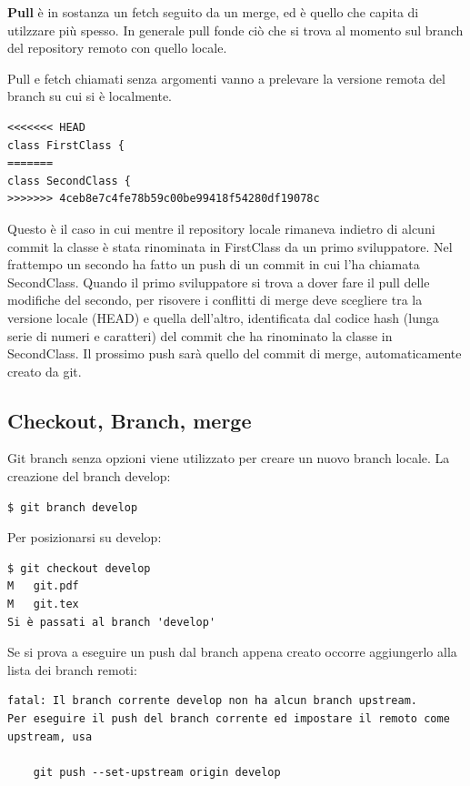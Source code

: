 \documentclass{article} \usepackage[textwidth=18cm,textheight=18cm]{geometry}
\begin{document}
\textbf{Pull} è in sostanza un fetch seguito da un merge, ed è quello che capita di
utilzzare più spesso. In generale pull fonde ciò che si trova al momento sul
branch del repository remoto con quello locale.

Pull e fetch chiamati senza argomenti vanno a prelevare la versione remota del
branch su cui si è localmente.

\begin{verbatim}
<<<<<<< HEAD
class FirstClass {
=======
class SecondClass {
>>>>>>> 4ceb8e7c4fe78b59c00be99418f54280df19078c
\end{verbatim}

Questo è il caso in cui mentre il repository locale rimaneva indietro di alcuni
commit la classe è stata rinominata in FirstClass da un primo sviluppatore. Nel
frattempo un secondo ha fatto un push di un commit in cui l'ha chiamata
SecondClass. Quando il primo sviluppatore si trova a dover fare il pull delle modifiche del
secondo, per risovere i conflitti di merge deve scegliere tra la versione locale
(HEAD) e quella dell'altro, identificata dal codice hash (lunga serie di numeri e
caratteri) del commit che ha
rinominato la classe in SecondClass. Il prossimo push sarà quello del commit di
merge, automaticamente creato da git.

\subsection{Checkout, Branch, merge}

Git branch senza opzioni viene utilizzato per creare un nuovo branch locale. La
creazione del branch develop:

\begin{verbatim}
$ git branch develop
\end{verbatim}

Per posizionarsi su develop:

\begin{verbatim}
$ git checkout develop
M	git.pdf
M	git.tex
Si è passati al branch 'develop'
\end{verbatim}

Se si prova a eseguire un push dal branch appena creato occorre
aggiungerlo alla lista dei branch remoti:

\begin{verbatim}
fatal: Il branch corrente develop non ha alcun branch upstream.
Per eseguire il push del branch corrente ed impostare il remoto come upstream, usa

    git push --set-upstream origin develop
\end{verbatim}
\end{document}
